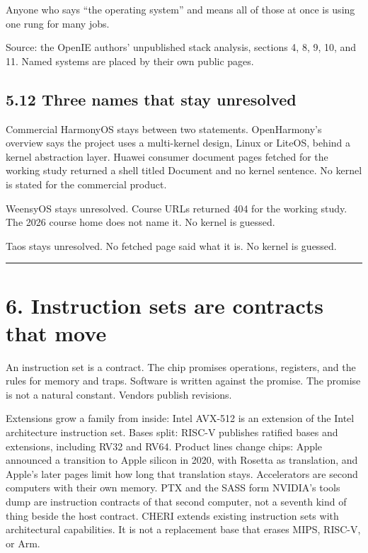 \documentclass[10pt,letterpaper]{article}
\begin{document}
Anyone who says ``the operating system'' and means all of those at once
is using one rung for many jobs.

Source: the OpenIE authors' unpublished stack analysis, sections 4, 8,
9, 10, and 11. Named systems are placed by their own public pages.

\subsection{5.12 Three names that stay
unresolved}\label{three-names-that-stay-unresolved}

Commercial HarmonyOS stays between two statements. OpenHarmony's
overview says the project uses a multi-kernel design, Linux or LiteOS,
behind a kernel abstraction layer. Huawei consumer document pages
fetched for the working study returned a shell titled Document and no
kernel sentence. No kernel is stated for the commercial product.

WeensyOS stays unresolved. Course URLs returned 404 for the working
study. The 2026 course home does not name it. No kernel is guessed.

Taos stays unresolved. No fetched page said what it is. No kernel is
guessed.

\begin{center}\rule{0.5\linewidth}{0.5pt}\end{center}

\section{6. Instruction sets are contracts that
move}\label{instruction-sets-are-contracts-that-move}

An instruction set is a contract. The chip promises operations,
registers, and the rules for memory and traps. Software is written
against the promise. The promise is not a natural constant. Vendors
publish revisions.

Extensions grow a family from inside: Intel AVX-512 is an extension of
the Intel architecture instruction set. Bases split: RISC-V publishes
ratified bases and extensions, including RV32 and RV64. Product lines
change chips: Apple announced a transition to Apple silicon in 2020,
with Rosetta as translation, and Apple's later pages limit how long that
translation stays. Accelerators are second computers with their own
memory. PTX and the SASS form NVIDIA's tools dump are instruction
contracts of that second computer, not a seventh kind of thing beside
the host contract. CHERI extends existing instruction sets with
architectural capabilities. It is not a replacement base that erases
MIPS, RISC-V, or Arm.
\end{document}
